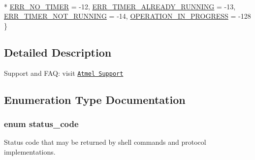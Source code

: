 \begin{DoxyCompactItemize}
\\*
\hyperlink{group__group__xmega__utils__status__codes_gga751c892e5a46b8e7d282085a5a5bf151a6d0a40d6d1356ffebe4fc22ec41b267f}{E\-R\-R\-\_\-\-N\-O\-\_\-\-T\-I\-M\-E\-R} =  -\/12, 
\hyperlink{group__group__xmega__utils__status__codes_gga751c892e5a46b8e7d282085a5a5bf151affb72bf05bbe079b38c284796cf3e746}{E\-R\-R\-\_\-\-T\-I\-M\-E\-R\-\_\-\-A\-L\-R\-E\-A\-D\-Y\-\_\-\-R\-U\-N\-N\-I\-N\-G} =  -\/13, 
\hyperlink{group__group__xmega__utils__status__codes_gga751c892e5a46b8e7d282085a5a5bf151a2119391dfc2668780bfd41a25426c32d}{E\-R\-R\-\_\-\-T\-I\-M\-E\-R\-\_\-\-N\-O\-T\-\_\-\-R\-U\-N\-N\-I\-N\-G} =  -\/14, 
\hyperlink{group__group__xmega__utils__status__codes_gga751c892e5a46b8e7d282085a5a5bf151a9b25aed7ac4ef4fc3c7250543bb113c0}{O\-P\-E\-R\-A\-T\-I\-O\-N\-\_\-\-I\-N\-\_\-\-P\-R\-O\-G\-R\-E\-S\-S} =  -\/128
 \}
\end{DoxyCompactItemize}


\subsection{Detailed Description}
Support and F\-A\-Q\-: visit \href{http://www.atmel.com/design-support/}{\tt Atmel Support} 

\subsection{Enumeration Type Documentation}
\hypertarget{group__group__xmega__utils__status__codes_ga751c892e5a46b8e7d282085a5a5bf151}{
\subsubsection[{status\-\_\-code}]{\setlength{\rightskip}{0pt plus 5cm}enum {\bf status\-\_\-code}}}\label{group__group__xmega__utils__status__codes_ga751c892e5a46b8e7d282085a5a5bf151}
Status code that may be returned by shell commands and protocol implementations.

